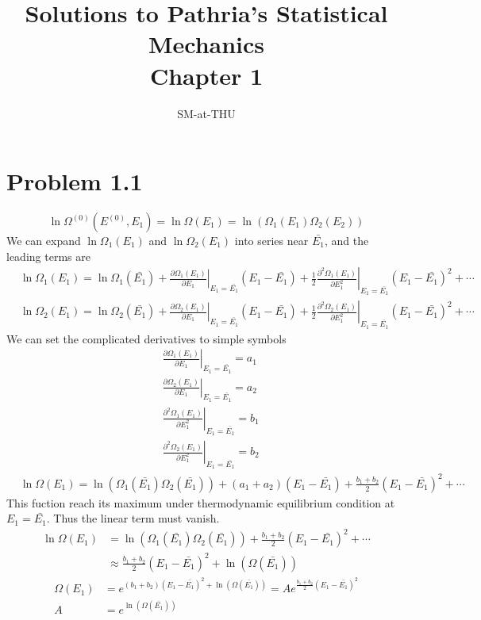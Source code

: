 \documentclass{article}
\author{SM-at-THU}
\title{\bf{Solutions to Pathria's Statistical Mechanics}\\Chapter 1}
\begin{document}
\maketitle
\section*{Problem 1.1}
\begin{equation}
\ln\Omega^{(0)}(E^{(0)},E_1)=\ln\Omega(E_1)=\ln(\Omega_1(E_1)\Omega_2(E_2))
\end{equation}
We can expand $\ln\Omega_1(E_1)$ and $\ln\Omega_2(E_1)$ into series near $\bar{E_1}$, and the leading terms are
\begin{align}
&\ln\Omega_1(E_1)=\ln\Omega_1(\bar{E_1})+\left. \frac{\partial \Omega_1(E_1)}{\partial E_1}\right|_{E_1=\bar{E_1}}(E_1-\bar{E_1})+\frac{1}{2}\left. \frac{\partial^2 \Omega_1(E_1)}{\partial E_1^2}\right|_{E_1=\bar{E_1}}(E_1-\bar{E_1})^2+\cdots\\
&\ln\Omega_2(E_1)=\ln\Omega_2(\bar{E_1})+\left. \frac{\partial \Omega_2(E_1)}{\partial E_1}\right|_{E_1=\bar{E_1}}(E_1-\bar{E_1})+\frac{1}{2}\left. \frac{\partial^2 \Omega_2(E_1)}{\partial E_1^2}\right|_{E_1=\bar{E_1}}(E_1-\bar{E_1})^2+\cdots
\end{align}
We can set the complicated derivatives to simple symbols
\begin{align}
&\left. \frac{\partial \Omega_1(E_1)}{\partial E_1}\right|_{E_1=\bar{E_1}}=a_1\\
&\left. \frac{\partial \Omega_2(E_1)}{\partial E_1}\right|_{E_1=\bar{E_1}}=a_2\\
&\left. \frac{\partial^2 \Omega_1(E_1)}{\partial E_1^2}\right|_{E_1=\bar{E_1}}=b_1\\
&\left. \frac{\partial^2 \Omega_2(E_1)}{\partial E_1^2}\right|_{E_1=\bar{E_1}}=b_2
\end{align}
\begin{align}
&\ln\Omega(E_1)=\ln(\Omega_1(\bar{E_1})\Omega_2(\bar{E_1}))+(a_1+a_2)(E_1-\bar{E_1})+\frac{b_1+b_2}{2}(E_1-\bar{E_1})^2+\cdots
\end{align}
This fuction reach its maximum under thermodynamic equilibrium condition at $E_1=\bar{E_1}$. Thus the linear term must vanish.
\begin{align}
\ln\Omega(E_1)&=\ln(\Omega_1(\bar{E_1})\Omega_2(\bar{E_1}))+\frac{b_1+b_2}{2}(E_1-\bar{E_1})^2+\cdots\\
&\approx \frac{b_1+b_2}{2}(E_1-\bar{E_1})^2+\ln(\Omega(\bar{E_1}))
\end{align}
\begin{align}
\Omega(E_1)&=e^{(b_1+b_2)(E_1-\bar{E_1})^2+\ln(\Omega(\bar{E_1}))}=Ae^{\frac{b_1+b_2}{2}(E_1-\bar{E_1})^2}\\
A&=e^{\ln(\Omega(\bar{E_1}))}
\end{align}
\end{document}
